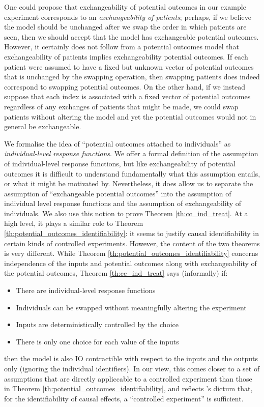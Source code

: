 One could propose that exchangeability of potential outcomes in our example experiment corresponds to an \emph{exchangeability of patients}; perhaps, if we believe the model should be unchanged after we swap the order in which patients are seen, then we should accept that the model has exchangeable potential outcomes. However, it certainly does not follow from a potential outcomes model that exchangeability of patients implies exchangeability potential outcomes. If each patient were assumed to have a fixed but unknown vector of potential outcomes that is unchanged by the swapping operation, then swapping patients does indeed correspond to swapping potential outcomes. On the other hand, if we instead suppose that each index is associated with a fixed vector of potential outcomes regardless of any exchanges of patients that might be made, we could swap patients without altering the model and yet the potential outcomes would not in general be exchangeable.

We formalise the idea of ``potential outcomes attached to individuals'' as \emph{individual-level response functions}. We offer a formal definition of the assumption of individual-level response functions, but like exchangeability of potential outcomes it is difficult to understand fundamentally what this assumption entails, or what it might be motivated by. Nevertheless, it does allow us to separate the assumption of ``exchangeable potential outcomes'' into the assumption of individual level response functions and the assumption of exchangeability of individuals. We also use this notion to prove Theorem \ref{th:cc_ind_treat}. At a high level, it plays a similar role to Theorem \ref{th:potential_outcomes_identifiability}: it seems to justify causal identifiability in certain kinds of controlled experiments. However, the content of the two theorems is very different. While Theorem \ref{th:potential_outcomes_identifiability} concerns independence of the inputs and potential outcomes along with exchangeability of the potential outcomes, Theorem \ref{th:cc_ind_treat} says (informally) if:
\begin{itemize}
    \item There are individual-level response functions
    \item Individuals can be swapped without meaningfully altering the experiment
    \item Inputs are deterministically controlled by the choice
    \item There is only one choice for each value of the inputs
\end{itemize}
then the model is also IO contractible with respect to the inputs and the outputs only (ignoring the individual identifiers). In our view, this comes closer to a set of assumptions that are directly appliccable to a controlled experiment than those in Theorem \ref{th:potential_outcomes_identifiability}, and reflects \citet{kasy_why_2016}'s dictum that, for the identifiability of causal effects, a ``controlled experiment'' is sufficient.

